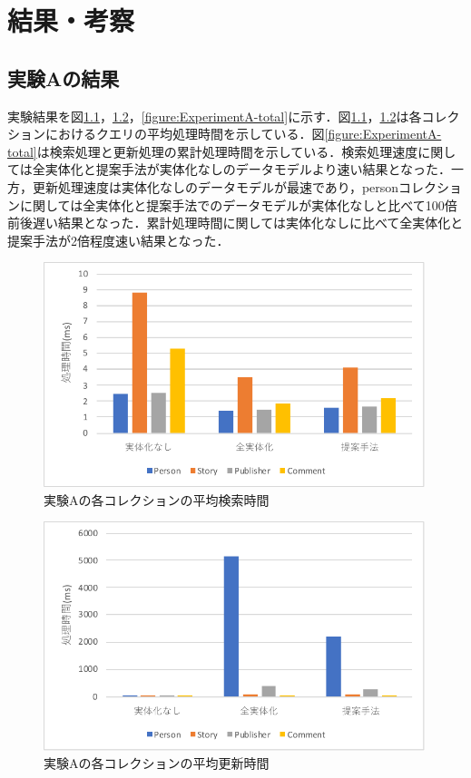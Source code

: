 \documentclass[a4paper,11pt]{ujreport}
\begin{document}
\chapter{結果・考察}
\label{chap:Result}
\section{実験Aの結果}
実験結果を図\ref{figure:ExperimentA-find}，\ref{figure:ExperimentA-update}，\ref{figure:ExperimentA-total}に示す．図\ref{figure:ExperimentA-find}，\ref{figure:ExperimentA-update}は各コレクションにおけるクエリの平均処理時間を示している．図\ref{figure:ExperimentA-total}は検索処理と更新処理の累計処理時間を示している．検索処理速度に関しては全実体化と提案手法が実体化なしのデータモデルより速い結果となった．一方，更新処理速度は実体化なしのデータモデルが最速であり，personコレクションに関しては全実体化と提案手法でのデータモデルが実体化なしと比べて100倍前後遅い結果となった．累計処理時間に関しては実体化なしに比べて全実体化と提案手法が2倍程度速い結果となった．
\begin{figure}[htbp]
	\begin{center}
		\includegraphics[width=30em]{src/ExperimentA-find.pdf} %
	\end{center}
	\caption{実験Aの各コレクションの平均検索時間}
	\label{figure:ExperimentA-find}
\end{figure}
\begin{figure}[htbp]
	\begin{center}
		\includegraphics[width=30em]{src/ExperimentA-update.pdf} %
	\end{center}
	\caption{実験Aの各コレクションの平均更新時間}
	\label{figure:ExperimentA-update}
\end{figure}
\end{document}
